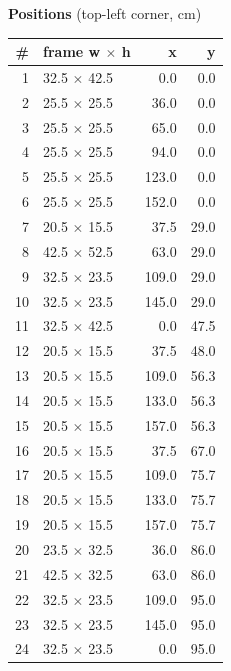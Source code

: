\documentclass[a4paper,landscape,10pt]{article}
\begin{document}
\begin{minipage}[t]{0.25\textwidth}
\vspace{8pt}
{\bfseries Positions} (top-left corner, cm)\\[2pt]
\tiny
\begin{tabular}{@{}r l r r@{}}
\toprule
\# & frame w $\times$ h & x & y \\
\midrule
1 & 32.5 $\times$ 42.5 & 0.0 & 0.0 \\
2 & 25.5 $\times$ 25.5 & 36.0 & 0.0 \\
3 & 25.5 $\times$ 25.5 & 65.0 & 0.0 \\
4 & 25.5 $\times$ 25.5 & 94.0 & 0.0 \\
5 & 25.5 $\times$ 25.5 & 123.0 & 0.0 \\
6 & 25.5 $\times$ 25.5 & 152.0 & 0.0 \\
7 & 20.5 $\times$ 15.5 & 37.5 & 29.0 \\
8 & 42.5 $\times$ 52.5 & 63.0 & 29.0 \\
9 & 32.5 $\times$ 23.5 & 109.0 & 29.0 \\
10 & 32.5 $\times$ 23.5 & 145.0 & 29.0 \\
11 & 32.5 $\times$ 42.5 & 0.0 & 47.5 \\
12 & 20.5 $\times$ 15.5 & 37.5 & 48.0 \\
13 & 20.5 $\times$ 15.5 & 109.0 & 56.3 \\
14 & 20.5 $\times$ 15.5 & 133.0 & 56.3 \\
15 & 20.5 $\times$ 15.5 & 157.0 & 56.3 \\
16 & 20.5 $\times$ 15.5 & 37.5 & 67.0 \\
17 & 20.5 $\times$ 15.5 & 109.0 & 75.7 \\
18 & 20.5 $\times$ 15.5 & 133.0 & 75.7 \\
19 & 20.5 $\times$ 15.5 & 157.0 & 75.7 \\
20 & 23.5 $\times$ 32.5 & 36.0 & 86.0 \\
21 & 42.5 $\times$ 32.5 & 63.0 & 86.0 \\
22 & 32.5 $\times$ 23.5 & 109.0 & 95.0 \\
23 & 32.5 $\times$ 23.5 & 145.0 & 95.0 \\
24 & 32.5 $\times$ 23.5 & 0.0 & 95.0 \\
\bottomrule
\end{tabular}
\end{minipage}
\clearpage
\end{document}
